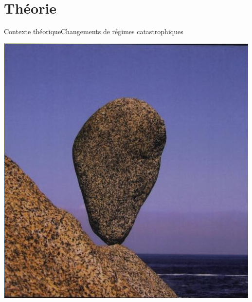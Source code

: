 \documentclass[10pt,aspectratio=149]{beamer}
\begin{document}
   \section{Théorie}
   


   \begin{frame}{Contexte théorique}{Changements de régimes catastrophiques}
      \begin{center}
      \includegraphics[height=0.6\textheight]{Figs/scheffer}\\
      \end{center}
   \end{frame}
\end{document}
